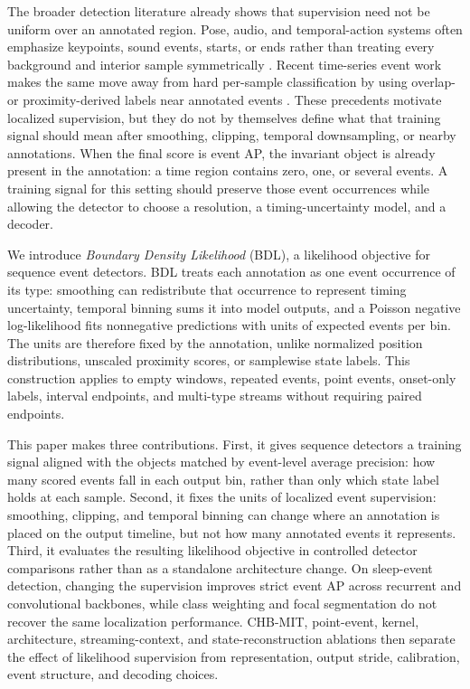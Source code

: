 The broader detection literature already shows that supervision need not be uniform over an annotated region.
Pose, audio, and temporal-action systems often emphasize keypoints, sound events, starts, or ends rather than treating every background and interior sample symmetrically \citep{newell2016stacked,xiao2018simple,luo2021,yu2022,phan2015,gao2017turn,lin2018bsn,lin2019bmn}.
Recent time-series event work makes the same move away from hard per-sample classification by using overlap- or proximity-derived labels near annotated events \citep{azib2023universal}.
These precedents motivate localized supervision, but they do not by themselves define what that training signal should mean after smoothing, clipping, temporal downsampling, or nearby annotations.
When the final score is event AP, the invariant object is already present in the annotation: a time region contains zero, one, or several events.
A training signal for this setting should preserve those event occurrences while allowing the detector to choose a resolution, a timing-uncertainty model, and a decoder.

We introduce \emph{Boundary Density Likelihood} (BDL), a likelihood objective for sequence event detectors.
BDL treats each annotation as one event occurrence of its type: smoothing can redistribute that occurrence to represent timing uncertainty, temporal binning sums it into model outputs, and a Poisson negative log-likelihood fits nonnegative predictions with units of expected events per bin.
The units are therefore fixed by the annotation, unlike normalized position distributions, unscaled proximity scores, or samplewise state labels.
This construction applies to empty windows, repeated events, point events, onset-only labels, interval endpoints, and multi-type streams without requiring paired endpoints.

This paper makes three contributions.
First, it gives sequence detectors a training signal aligned with the objects matched by event-level average precision: how many scored events fall in each output bin, rather than only which state label holds at each sample.
Second, it fixes the units of localized event supervision: smoothing, clipping, and temporal binning can change where an annotation is placed on the output timeline, but not how many annotated events it represents.
Third, it evaluates the resulting likelihood objective in controlled detector comparisons rather than as a standalone architecture change.
On sleep-event detection, changing the supervision improves strict event AP across recurrent and convolutional backbones, while class weighting and focal segmentation do not recover the same localization performance.
CHB-MIT, point-event, kernel, architecture, streaming-context, and state-reconstruction ablations then separate the effect of likelihood supervision from representation, output stride, calibration, event structure, and decoding choices.

